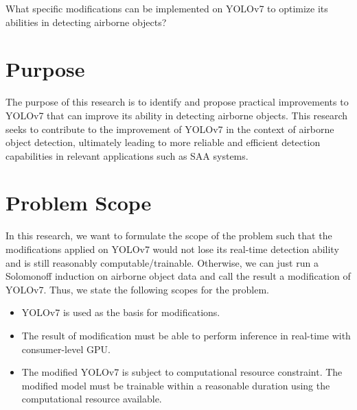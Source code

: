     What specific modifications can be implemented on YOLOv7 to optimize its abilities in detecting airborne objects?

\section{Purpose}
    The purpose of this research is to identify and propose practical improvements to YOLOv7 that can improve its ability in detecting airborne objects. 
    This research seeks to contribute to the improvement of YOLOv7 in the context of airborne object detection, ultimately leading to more reliable and efficient detection capabilities in relevant applications such as SAA systems.

\section{Problem Scope}
    In this research, we want to formulate the scope of the problem such that the modifications applied
    on YOLOv7 would not lose its real-time detection ability and is still reasonably computable/trainable.
    Otherwise, we can just run a Solomonoff induction on airborne object data and call the result a modification
    of YOLOv7. Thus, we state the following scopes for the problem.
    \begin{itemize}%
        \item YOLOv7 is used as the basis for modifications. 
        \item The result of modification must be able to perform inference in real-time with consumer-level GPU.
        \item The modified YOLOv7 is subject to computational resource constraint. The modified model must be trainable within a reasonable duration using the computational resource
        available.%
    \end{itemize}
